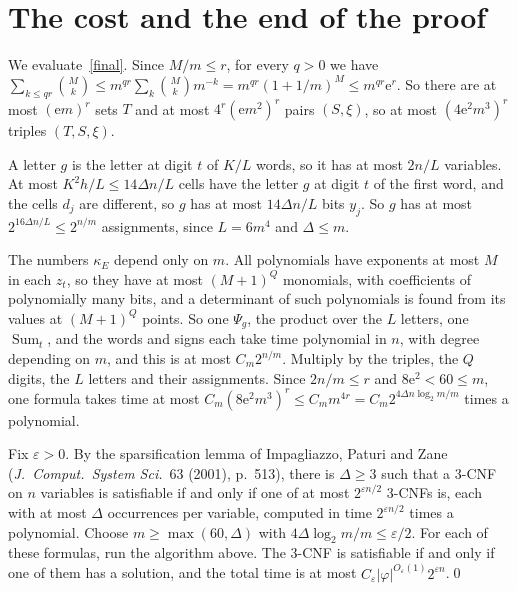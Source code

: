 \documentclass[10pt]{article}
\begin{document}
\section{The cost and the end of the proof}

We evaluate~\eqref{final}. Since $M/m\le r$, for every $q>0$ we have $\sum_{k\le qr}\binom Mk\le m^{qr}\sum_k\binom Mkm^{-k}=m^{qr}(1+1/m)^M\le m^{qr}\mathrm e^r$. So there are at most $(\mathrm em)^r$ sets $T$ and at most $4^r(\mathrm em^2)^r$ pairs $(S,\xi)$, so at most $(4\mathrm e^2m^3)^r$ triples $(T,S,\xi)$.

A letter $g$ is the letter at digit $t$ of $K/L$ words, so it has at most $2n/L$ variables. At most $K^2h/L\le14\Delta n/L$ cells have the letter $g$ at digit $t$ of the first word, and the cells $d_j$ are different, so $g$ has at most $14\Delta n/L$ bits $y_j$. So $g$ has at most $2^{16\Delta n/L}\le2^{n/m}$ assignments, since $L=6m^4$ and $\Delta\le m$.

The numbers $\kappa_E$ depend only on $m$. All polynomials have exponents at most $M$ in each $z_t$, so they have at most $(M+1)^Q$ monomials, with coefficients of polynomially many bits, and a determinant of such polynomials is found from its values at $(M+1)^Q$ points. So one $\Psi_g$, the product over the $L$ letters, one $\operatorname{Sum}_t$, and the words and signs each take time polynomial in $n$, with degree depending on $m$, and this is at most $C_m2^{n/m}$. Multiply by the triples, the $Q$ digits, the $L$ letters and their assignments. Since $2n/m\le r$ and $8\mathrm e^2<60\le m$, one formula takes time at most $C_m(8\mathrm e^2m^3)^r\le C_mm^{4r}=C_m2^{4\Delta n\log_2m/m}$ times a polynomial.

Fix $\varepsilon>0$. By the sparsification lemma of Impagliazzo, Paturi and Zane (\emph{J.\ Comput.\ System Sci.}\ 63 (2001), p.~513), there is $\Delta\ge3$ such that a 3-CNF on $n$ variables is satisfiable if and only if one of at most $2^{\varepsilon n/2}$ 3-CNFs is, each with at most $\Delta$ occurrences per variable, computed in time $2^{\varepsilon n/2}$ times a polynomial. Choose $m\ge\max(60,\Delta)$ with $4\Delta\log_2m/m\le\varepsilon/2$. For each of these formulas, run the algorithm above. The 3-CNF is satisfiable if and only if one of them has a solution, and the total time is at most $C_\varepsilon|\varphi|^{O_\varepsilon(1)}2^{\varepsilon n}$.\qed
\end{document}
